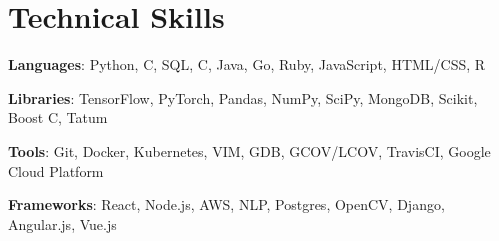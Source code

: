 \documentclass[letterpaper,11pt]{article}
\renewcommand\small{\normalsize}
\def\CC{{C\nolinebreak[4]\hspace{-.05em}\raisebox{.4ex}{\tiny\bf ++}}}
\begin{document}
\section{Technical Skills}
 \begin{itemize}[leftmargin=10.8pt, label={}]
    \small{\item{
     \textbf{Languages}{: \hspace{1.5mm} Python, \CC, SQL, C, Java, Go, Ruby, JavaScript, HTML/CSS, R} \\
     }}
     \vspace{0pt}
      \small{\item{
     \textbf{Libraries}{:\hspace{6.2mm} TensorFlow, PyTorch, Pandas, NumPy, SciPy, MongoDB, Scikit, Boost \CC, Tatum} \\
     }}\vspace{0pt}
      \small{\item{
     \textbf{Tools}{:\hspace{13mm} Git, Docker, Kubernetes, VIM, GDB, GCOV/LCOV, TravisCI, Google Cloud Platform} \\
     }}\vspace{0pt}
      \small{\item{
     \textbf{Frameworks}{: React, Node.js, AWS, NLP, Postgres, OpenCV, Django, Angular.js, Vue.js} \\
    }}
 \end{itemize}

\end{document}
